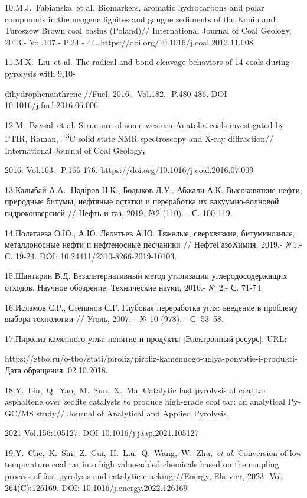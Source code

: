 \begin{noparindent}
10.M.J.~Fabianska\emph{~}et al\emph{.} Biomarkers, aromatic hydrocarbons
and polar compounds in the neogene lignites and gangue sediments of the
Konin and Turoszow Brown coal basins (Poland)// International Journal of
Coal Geology, 2013.- Vol.107.- P.24 - 44.
https://doi.org/10.1016/j.coal.2012.11.008

11.M.X.~Liu\emph{~}et al. The radical and bond cleavage behaviors of 14
coals during pyrolysis with 9,10-

dihydrophenanthrene //Fuel, 2016.-
Vol.182.- P.480-486. DOI 10.1016/j.fuel.2016.06.006

12.M.~Baysal\emph{~}et al. Structure of some western Anatolia coals
investigated by FTIR, Raman,~\textsuperscript{13}C solid state NMR
spectroscopy and X-ray diffraction// International Journal of Coal
Geology{\bfseries ,}

2016.-Vol.163.- P.166-176{\bfseries .}
https://doi.org/10.1016/j.coal.2016.07.009

13.Калыбай А.А., Нәдіров Н.К., Бодыков Д.У., Абжали А.К. Высоковязкие
нефти, природные битумы, нефтяные остатки и переработка их
вакуумно-волновой гидроконверсией // Нефть и газ, 2019.-№2 (110). - С.
100-119.

14.Полетаева О.Ю., А.Ю. Леонтьев А.Ю. Тяжелые, сверхвязкие,
битуминозные, металлоносные нефти и нефтеносные песчаники //
НефтеГазоХимия, 2019.- №1.- С. 19-24. DOI:
10.24411/2310-8266-2019-10103.

15.Шантарин В.Д. Безальтернативный метод утилизации углеродосодержащих
отходов. Научное обо­зрение. Технические науки, 2016.- № 2.- С. 71-74.

16.Исламов С.Р., Степанов С.Г. Глубокая переработка угля: введение в
проблему выбора технологии // Уголь, 2007. - № 10 (978). - С. 53--58.

17.Пиролиз каменного угля: понятие и продукты {[}Электронный ресурс{]}.
URL:

https://ztbo.ru/o-tbo/stati/piroliz/piroliz-kamennogo-uglya-ponyatie-i-produkti-Дата
обращения: 02.10.2018.

18.Y.~Liu,~Q.~Yao,~M.~Sun,~X.~Ma. Catalytic fast pyrolysis of coal tar
asphaltene over zeolite catalysts to produce high-grade coal tar: an
analytical Py-GC/MS study// Journal of Analytical and Applied Pyrolysis,

2021-Vol.156:105127. DOI 10.1016/j.jaap.2021.105127

19.Y.~Che,~K.~Shi,~Z.~Cui,~H.~Liu,~Q.~Wang,~W.~Zhu,~\emph{et al.}
Conversion of low temperature coal tar into high value-added chemicals
based on the coupling process of fast pyrolysis and catalytic cracking
//Energy, Elsevier, 2023- Vol. 264(C):126169. DOI:
10.1016/j.energy.2022.126169


\end{noparindent}
